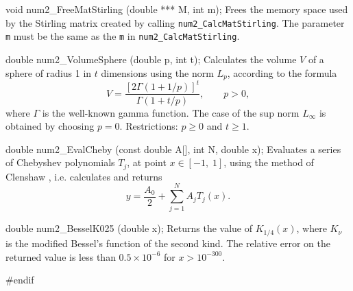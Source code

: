 void num2_FreeMatStirling (double *** M, int m);
\endcode
  \tab Frees the memory space used by the Stirling matrix created by calling
  {\tt num2\_CalcMatStirling}. The parameter {\tt m}
  must be the same as the {\tt m} in  {\tt num2\_CalcMatStirling}.
  \endtab
\code


double num2_VolumeSphere (double p, int t);
\endcode
\tab Calculates the volume $V$ of a sphere of radius 1 in $t$ dimensions
  using the norm $L_p$, according to the formula
$$
       V = \frac{\left[2 \Gamma(1 + 1/p)\right]^t}
             {\Gamma\left(1 + t/p\right)}, \qquad p > 0,
$$
  where $\Gamma$ is the well-known gamma function.
  The case of the sup norm $L_\infty$ is
  obtained by choosing $p=0$.
  Restrictions: $p\ge 0$ and $t\ge 1$.
  \endtab
\code


double num2_EvalCheby (const double A[], int N, double x);
\endcode
\tab Evaluates a series of Chebyshev polynomials $T_j$, at point
  $x \in [-1, \;1]$, using the method of Clenshaw \cite{mCLE62a},
   i.e. calculates and  returns
  $$
    y = \frac{A_0}2 + \sum_{j=1}^N A_j T_j(x).
  $$
\endtab
\code


double num2_BesselK025 (double x);
\endcode
\tab Returns the value of $K_{1/4}(x)$, where $K_{\nu}$ is the modified
  Bessel's
  function of the second kind.
  The relative error on the returned value is less than
  $0.5\times 10^{-6}$ for $x > 10^{-300}$.
\endtab
\code
\hide

#endif
\endhide
\endcode





